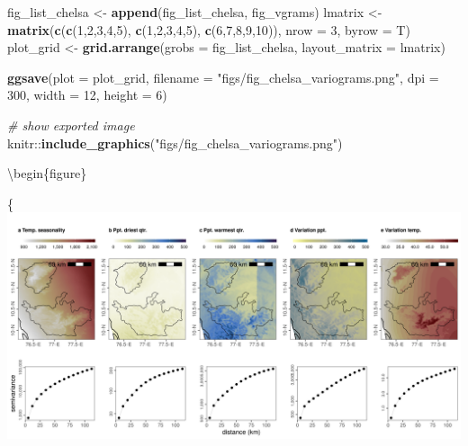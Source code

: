 \documentclass[]{article}
\newenvironment{Shaded}{}{}
\newcommand{\CommentTok}[1]{\textcolor[rgb]{0.38,0.63,0.69}{\textit{#1}}}
\newcommand{\DataTypeTok}[1]{\textcolor[rgb]{0.56,0.13,0.00}{#1}}
\newcommand{\DecValTok}[1]{\textcolor[rgb]{0.25,0.63,0.44}{#1}}
\newcommand{\KeywordTok}[1]{\textcolor[rgb]{0.00,0.44,0.13}{\textbf{#1}}}
\newcommand{\NormalTok}[1]{#1}
\newcommand{\OperatorTok}[1]{\textcolor[rgb]{0.40,0.40,0.40}{#1}}
\newcommand{\StringTok}[1]{\textcolor[rgb]{0.25,0.44,0.63}{#1}}
\begin{document}
\begin{Shaded}
\begin{Highlighting}[]
\NormalTok{fig_list_chelsa <-}\StringTok{ }\KeywordTok{append}\NormalTok{(fig_list_chelsa, fig_vgrams)}
\NormalTok{lmatrix <-}\StringTok{ }\KeywordTok{matrix}\NormalTok{(}\KeywordTok{c}\NormalTok{(}\KeywordTok{c}\NormalTok{(}\DecValTok{1}\NormalTok{,}\DecValTok{2}\NormalTok{,}\DecValTok{3}\NormalTok{,}\DecValTok{4}\NormalTok{,}\DecValTok{5}\NormalTok{), }\KeywordTok{c}\NormalTok{(}\DecValTok{1}\NormalTok{,}\DecValTok{2}\NormalTok{,}\DecValTok{3}\NormalTok{,}\DecValTok{4}\NormalTok{,}\DecValTok{5}\NormalTok{), }\KeywordTok{c}\NormalTok{(}\DecValTok{6}\NormalTok{,}\DecValTok{7}\NormalTok{,}\DecValTok{8}\NormalTok{,}\DecValTok{9}\NormalTok{,}\DecValTok{10}\NormalTok{)), }\DataTypeTok{nrow =} \DecValTok{3}\NormalTok{, }\DataTypeTok{byrow =}\NormalTok{ T)}
\NormalTok{plot_grid <-}\StringTok{ }\KeywordTok{grid.arrange}\NormalTok{(}\DataTypeTok{grobs =}\NormalTok{ fig_list_chelsa, }\DataTypeTok{layout_matrix =}\NormalTok{ lmatrix)}

\KeywordTok{ggsave}\NormalTok{(}\DataTypeTok{plot =}\NormalTok{ plot_grid, }\DataTypeTok{filename =} \StringTok{"figs/fig_chelsa_variograms.png"}\NormalTok{, }\DataTypeTok{dpi =} \DecValTok{300}\NormalTok{, }\DataTypeTok{width =} \DecValTok{12}\NormalTok{, }\DataTypeTok{height =} \DecValTok{6}\NormalTok{)}
\end{Highlighting}
\end{Shaded}

\begin{Shaded}
\begin{Highlighting}[]

\CommentTok{# show exported image}
\NormalTok{knitr}\OperatorTok{::}\KeywordTok{include_graphics}\NormalTok{(}\StringTok{"figs/fig_chelsa_variograms.png"}\NormalTok{)}
\end{Highlighting}
\end{Shaded}

\textbackslash{}begin\{figure\}

\{\centering \includegraphics[width=\textwidth]{figs/fig_chelsa_variograms}
\end{document}
